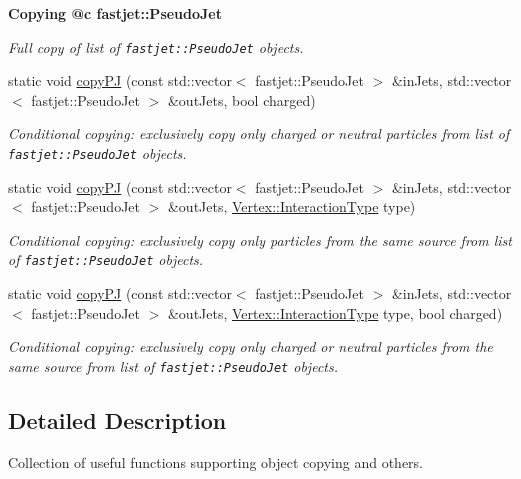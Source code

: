 \begin{Indent}{\bf Copying @c fastjet::Pseudo\-Jet}
\begin{CompactItemize}
\begin{CompactList}\small\item\em Full copy of list of {\tt fastjet::Pseudo\-Jet} objects. \item\end{CompactList}\item 
static void \hyperlink{structUtils_e158c164f104a0d12bffcdb3b8c42674}{copy\-PJ} (const std::vector$<$ fastjet::Pseudo\-Jet $>$ \&in\-Jets, std::vector$<$ fastjet::Pseudo\-Jet $>$ \&out\-Jets, bool charged)
\begin{CompactList}\small\item\em Conditional copying: exclusively copy only charged or neutral particles from list of {\tt fastjet::Pseudo\-Jet} objects. \item\end{CompactList}\item 
static void \hyperlink{structUtils_c14816a57d84011c08359d8afe04df99}{copy\-PJ} (const std::vector$<$ fastjet::Pseudo\-Jet $>$ \&in\-Jets, std::vector$<$ fastjet::Pseudo\-Jet $>$ \&out\-Jets, \hyperlink{classVertex_0d80a5c5ed3bd9be72a325aa448eca25}{Vertex::Interaction\-Type} type)
\begin{CompactList}\small\item\em Conditional copying: exclusively copy only particles from the same source from list of {\tt fastjet::Pseudo\-Jet} objects. \item\end{CompactList}\item 
static void \hyperlink{structUtils_090c488d949a88d96e366d4cb78c10d9}{copy\-PJ} (const std::vector$<$ fastjet::Pseudo\-Jet $>$ \&in\-Jets, std::vector$<$ fastjet::Pseudo\-Jet $>$ \&out\-Jets, \hyperlink{classVertex_0d80a5c5ed3bd9be72a325aa448eca25}{Vertex::Interaction\-Type} type, bool charged)
\begin{CompactList}\small\item\em Conditional copying: exclusively copy only charged or neutral particles from the same source from list of {\tt fastjet::Pseudo\-Jet} objects. \item\end{CompactList}\end{CompactItemize}
\end{Indent}


\subsection{Detailed Description}
Collection of useful functions supporting object copying and others. 



